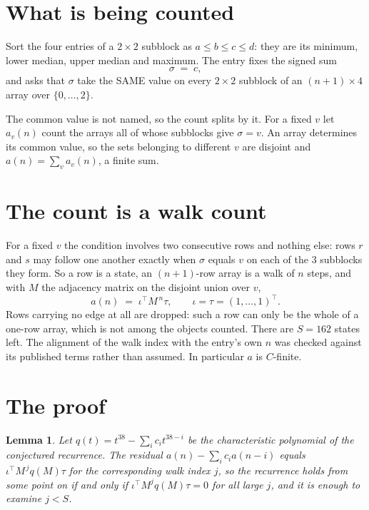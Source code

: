 \documentclass[11pt,a4paper]{article}
\theoremstyle{plain}
\newtheorem{lemma}[theorem]{Lemma}
\theoremstyle{definition}
\begin{document}
\section{What is being counted}

Sort the four entries of a $2\times2$ subblock as $a\le b\le c\le d$: they
are its minimum, lower median, upper median and maximum. The entry fixes the signed sum
\[
\sigma\;=\;c,
\]
and asks that $\sigma$ take the SAME value on every $2\times2$ subblock of an
$(n+1)\times4$ array over $\{0,\dots,2\}$.

The common value is not named, so the count splits by it. For a fixed $v$ let $a_v(n)$ count
the arrays all of whose subblocks give $\sigma=v$. An array determines its common value, so
the sets belonging to different $v$ are disjoint and $a(n)=\sum_v a_v(n)$, a finite sum.


\section{The count is a walk count}

For a fixed $v$ the condition involves two consecutive rows and nothing
else: rows $r$ and $s$ may follow one another exactly when $\sigma$ equals $v$ on each of the
$3$ subblocks they form. So a row is a state, an $(n+1)$-row array is a walk of $n$
steps, and with $M$ the adjacency matrix on the disjoint union over $v$,
\[
a(n)\;=\;\iota^{\!\top}M^{\,n}\tau,\qquad\iota=\tau=(1,\dots,1)^{\!\top} .
\]
Rows carrying no edge at all are dropped: such a row can only be the whole of a one-row
array, which is not among the objects counted. There are $S=162$ states left.
The alignment of the walk index with the entry's own $n$ was checked against its published
terms rather than assumed. In particular $a$ is $C$-finite.

\section{The proof}

\begin{lemma}\label{lem:crit}
Let $q(t)=t^{38}-\sum_i c_it^{38-i}$ be the characteristic polynomial of the
conjectured recurrence. The residual $a(n)-\sum_ic_ia(n-i)$ equals
$\iota^{\!\top}M^{\,j}q(M)\tau$ for the corresponding walk index $j$, so the recurrence
holds from some point on if and only if $\iota^{\!\top}M^{j}q(M)\tau=0$ for all large $j$,
and it is enough to examine $j<S$.
\end{lemma}
\end{document}
